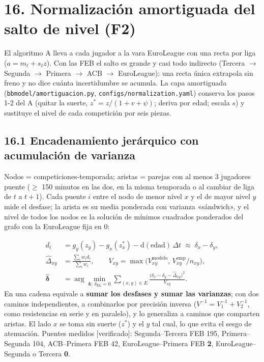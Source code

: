 \documentclass[10pt,a4paper]{article}
\begin{document}
\section*{16. Normalización amortiguada del salto de nivel (F2)}
El algoritmo A lleva a cada jugador a la vara EuroLeague con una recta por liga ($a = m_\ell + s_\ell z$). Con las FEB el salto es grande y casi todo indirecto (Tercera \ensuremath{\to} Segunda \ensuremath{\to} Primera \ensuremath{\to} ACB \ensuremath{\to} EuroLeague): una recta única extrapola sin freno y no dice cuánta incertidumbre se acumula. La capa amortiguada (\texttt{bbmodel/\allowbreak{}amortiguacion.py}, \texttt{configs/\allowbreak{}normalization.yaml}) conserva los pasos 1-2 del A (quitar la suerte, $z^{*} = z/(1+v+\psi)$; deriva por edad; escala $s$) y sustituye el nivel de cada competición por seis piezas.

\subsection*{16.1 Encadenamiento jerárquico con acumulación de varianza}
Nodos = competiciones-temporada; aristas = parejas con al menos 3 jugadores puente (\ensuremath{\geq} 150 minutos en las dos, en la misma temporada o al cambiar de liga de $t$ a $t+1$). Cada puente $i$ entre el nodo de menor nivel $x$ y el de mayor nivel $y$ mide el desfase; la arista es su media ponderada con varianza «sándwich», y el nivel de todos los nodos es la solución de mínimos cuadrados ponderados del grafo con la EuroLeague fija en 0:

\[
\begin{aligned} d_i &= g_y(z_y) - g_x(z^{*}_x) - \mathrm{d}(\text{edad})\,\Delta t \;\approx\; \delta_x - \delta_y,\\ \hat\Delta_{xy} &= \frac{\sum_i w_i d_i}{\sum_i w_i}, \qquad V_{xy} = \max\!\big(V^{\mathrm{modelo}}_{xy},\, V^{\mathrm{emp}}_{xy}/n_{xy}\big),\\ \hat{\boldsymbol\delta} &= \arg\min_{\boldsymbol\delta:\ \delta_{\mathrm{EL}}=0} \sum_{(x,y)\in E} \frac{\big(\delta_x - \delta_y - \hat\Delta_{xy}\big)^2}{V_{xy}} . \end{aligned}
\]
En una cadena equivale a \textbf{sumar los desfases y sumar las varianzas}; con dos caminos independientes, a combinarlos por precisión inversa ($V^{-1} = V_1^{-1} + V_2^{-1}$, como resistencias en serie y en paralelo), y lo generaliza a caminos que comparten aristas. El lado $x$ se toma sin suerte ($z^{*}$) y el $y$ tal cual, lo que evita el sesgo de atenuación. Puentes medidos [verificado]: Segunda--Tercera FEB 195, Primera--Segunda 104, ACB--Primera FEB 42, EuroLeague--Primera FEB \textbf{2}, EuroLeague--Segunda o Tercera \textbf{0}.
\end{document}

